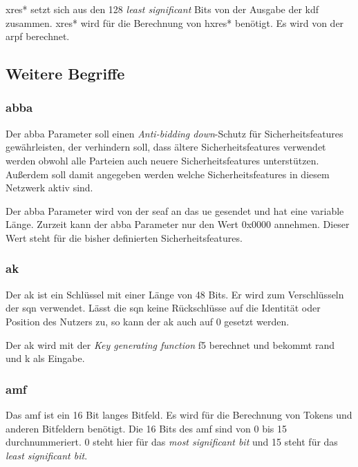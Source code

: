 \gls{xres*} setzt sich aus den 128 \textit{least significant} Bits von der Ausgabe der \gls{kdf} zusammen.
\gls{xres*} wird für die Berechnung von \gls{hxres*} benötigt.
Es wird von der \gls{arpf} berechnet.


\subsection{Weitere Begriffe}

\subsubsection{\gls{abba}}
Der \gls{abba} Parameter soll einen \textit{Anti-bidding down}-Schutz für Sicherheitsfeatures gewährleisten, der verhindern soll, dass ältere Sicherheitsfeatures verwendet werden obwohl alle Parteien auch neuere Sicherheitsfeatures unterstützen. %
Außerdem soll damit angegeben werden welche Sicherheitsfeatures in diesem Netzwerk aktiv sind.

Der \gls{abba} Parameter wird von der \gls{seaf} an das \gls{ue} gesendet und hat eine variable Länge.
Zurzeit kann der \gls{abba} Parameter nur den Wert 0x0000 annehmen. Dieser Wert steht für die bisher definierten Sicherheitsfeatures. %

\subsubsection{\gls{ak}}
Der \gls{ak} ist ein Schlüssel mit einer Länge von 48 Bits.
Er wird zum Verschlüsseln der \gls{sqn} verwendet. %
Lässt die \gls{sqn} keine Rückschlüsse auf die Identität oder Position des Nutzers zu, so kann der \gls{ak} auch auf 0 gesetzt werden. %

Der \gls{ak} wird mit der \textit{Key generating function} f5 berechnet und bekommt \gls{rand} und \gls{k} als Eingabe. %

\subsubsection{\gls{amf}}
Das \gls{amf} ist ein 16 Bit langes Bitfeld. %
Es wird für die Berechnung von Tokens und anderen Bitfeldern benötigt.
Die 16 Bits des \gls{amf} sind von 0 bis 15 durchnummeriert. %
0 steht hier für das \textit{most significant bit} und 15 steht für das \textit{least significant bit}.


